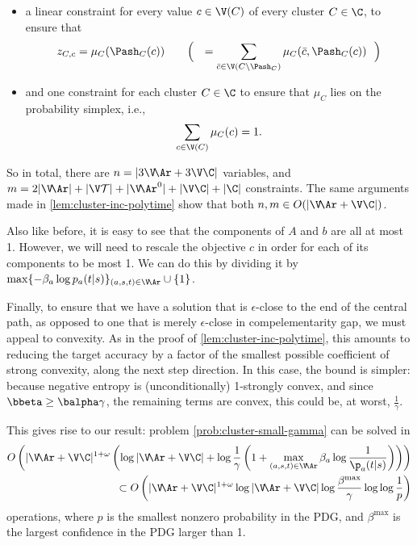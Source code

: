 \begin{lproof}
\begin{itemize}[label=$\blacktriangleright$]
\begin{itemize}[label=\textbullet]

             
            \item a linear constraint for every value $c \in \V(C)$ of every cluster $C \in \C$, to ensure that
            \[
                z_{C,c} = \mu_C( \Pash_C(c) )
                    \qquad \Big(~~= \sum_{\bar c \in \V(C \setminus \Pash_C)}
                        \mu_{C}(\bar c, \Pash_C(c)) ~~\Big)
            \]
            \item and one constraint for each cluster $C \in \C$ to ensure that $\mu_{C}$ lies on the probability simplex, i.e.,
            \[
                \sum_{c \in \V(C)} \mu_C(c) = 1.
            \]
        \end{itemize}
    \end{itemize}
    So in total, there are 
    $n = |3 \V \!\Ar + 3 \V \C|$ variables,
    and 
    $m = 2 |\V\!\Ar| + |\V \mathcal T| + |\V\!\Ar^0| + |\V \C| + |\C|$ constraints. 
    The same arguments made in \cref{lem:cluster-inc-polytime} show that both $n,m \in O(|\V \!\Ar + \V \C|)$.
    
    Also like before, it is easy to see that the components of $A$ and $b$ are all at most 1.  However, we will need to rescale the objective $c$ in order for each of its components to be most 1. We can do this by dividing it by
    $\max \{ - \beta_a \log {p_a(t|s)} \}_{(a,s,t) \in \V\!\Ar} \cup \{ 1 \}$.
    
    Finally, to ensure that we have a solution that is $\epsilon$-close to the end of the central path, as opposed to one that is merely $\epsilon$-close in compelementarity gap, we must appeal to convexity. 
    As in the proof of \cref{lem:cluster-inc-polytime}, this amounts to reducing the target accuracy by a factor of the smallest possible coefficient of strong convexity, along the next step direction. 
    In this case, the bound is simpler: because negative entropy is (unconditionally) 1-strongly convex, and since $\bbeta \ge \balpha \gamma$, the remaining terms are convex, this could be, at worst, $\frac1\gamma$. 
    
    This gives rise to our result: problem \eqref{prob:cluster-small-gamma} can be solved in 
    \begin{align*}
        O\left( |\V \!\Ar + \V \C|^{1+\omega} 
            \left(\log |\V \!\Ar + \V \C| + \log \frac1\gamma \left(1 + \max_{(a,s,t) \in \V\!\Ar} \beta_a \log \frac{1}{\p_a(t|s)} \right) \right)  \right) \\
        \subset 
        O\left( |\V \!\Ar + \V \C|^{1+ \omega} 
            \log |\V \!\Ar + \V \C|
            \log  \frac{\beta^{\max}}{\gamma} \log\log \frac{1}{p} \right)
    \end{align*}
    operations, where $p$ is the smallest nonzero probability in the PDG, and $\beta^{\max}$ is the largest confidence in the PDG larger than 1.
\end{lproof}

